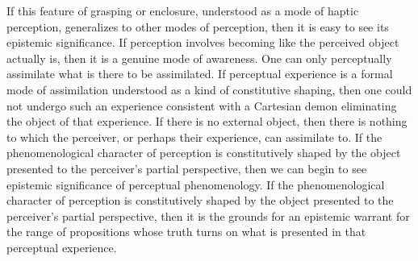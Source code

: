 If this feature of grasping or enclosure, understood as a mode of haptic perception, generalizes to other modes of perception, then it is easy to see its epistemic significance. If perception involves becoming like the perceived object actually is, then it is a genuine mode of awareness. One can only perceptually assimilate what is there to be assimilated. If perceptual experience is a formal mode of assimilation understood as a kind of constitutive shaping, then one could not undergo such an experience consistent with a Cartesian demon eliminating the object of that experience. If there is no external object, then there is nothing to which the perceiver, or perhaps their experience, can assimilate to. If the phenomenological character of perception is constitutively shaped by the object presented to the perceiver's partial perspective, then we can begin to see epistemic significance of perceptual phenomenology. If the phenomenological character of perception is constitutively shaped by the object presented to the perceiver's partial perspective, then it is the grounds for an epistemic warrant for the range of propositions whose truth turns on what is presented in that perceptual experience.

